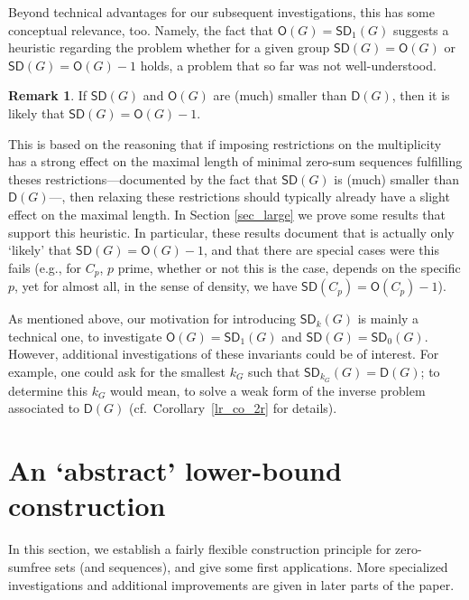 \documentclass{amsart}
\theoremstyle{definition}
\newtheorem{rem}[thm]{Remark}
\numberwithin{equation}{section}
\begin{document}
Beyond technical advantages for our subsequent investigations, this has some
conceptual relevance, too. Namely, the fact that ${\mathsf{O}}(G)={\mathsf{SD}}_1(G)$ suggests
a heuristic regarding the problem whether for a given group
${\mathsf{SD}}(G)={\mathsf{O}}(G) $ or ${\mathsf{SD}}(G)={\mathsf{O}}(G)-1$ holds, a problem that so far was not well-understood.

\begin{rem}
\label{rem_heuristic}
If ${\mathsf{SD}}(G)$ and ${\mathsf{O}}(G)$ are (much) smaller than ${\mathsf{D}}(G)$, then
it is likely that ${\mathsf{SD}}(G)={\mathsf{O}}(G)-1$.
\end{rem}
This is based on the reasoning that if imposing restrictions on the multiplicity has a strong effect on the maximal length of minimal zero-sum sequences fulfilling theses restrictions---documented by the fact that ${\mathsf{SD}}(G)$ is (much) smaller than ${\mathsf{D}}(G)$---, then relaxing these restrictions should typically already have a slight effect on the maximal length. In Section \ref{sec_large}
we prove some results that support this heuristic.
In particular, these results document that is actually only `likely'
that ${\mathsf{SD}}(G)={\mathsf{O}}(G)-1$, and that there are special cases were this fails
(e.g., for $C_p$, $p$ prime, whether or not this is the case, depends on the specific $p$,
yet for almost all, in the sense of density, we have ${\mathsf{SD}}(C_p)={\mathsf{O}}(C_p)-1$).

As mentioned above, our motivation for introducing ${\mathsf{SD}}_k(G)$ is mainly a technical one, to investigate
${\mathsf{O}}(G)={\mathsf{SD}}_1(G)$ and ${\mathsf{SD}}(G)={\mathsf{SD}}_0(G)$.
However, additional investigations of these invariants could be of interest.
For example, one could ask for the smallest $k_G$ such that ${\mathsf{SD}}_{k_G}(G)={\mathsf{D}}(G)$;
to determine this $k_G$ would mean, to solve a weak form of the inverse problem associated to ${\mathsf{D}}(G)$ (cf.~Corollary~\ref{lr_co_2r} for details).

\section{An `abstract' lower-bound construction}
\label{sec_abstractbound}

In this section, we establish a fairly flexible construction
principle for zero-sumfree sets (and sequences),
and give some first applications. More specialized investigations and additional
improvements are given in later parts of the paper.
\end{document}
